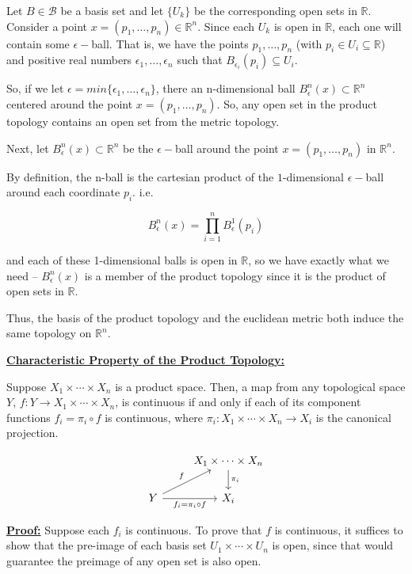 \documentclass{article}
\begin{document}
\vskip 0.5cm
Let $B \in \mathcal B$ be a basis set and let $\{U_k\}$ be the corresponding open sets in $\mathbb{R}$. Consider a point $x = (p_1, \dots, p_n) \in \mathbb{R}^n$. Since each $U_k$ is open in $\mathbb{R}$, each one will contain some $\epsilon-$ball. That is, we have the points $p_1, \dots, p_n$ (with $p_i \in U_i \subseteq \mathbb{R}$) and positive real numbers $\epsilon_1, \dots, \epsilon_n$ such that $B_{\epsilon_i}(p_i) \subseteq U_i$.

\vskip 0.5cm
So, if we let $\epsilon = min\{ \epsilon_1, \dots, \epsilon_n \}$, there an n-dimensional ball $B_{\epsilon}^{n}(x) \subset \mathbb{R}^{n}$ centered around the point $x = (p_1, \dots, p_n)$. So, any open set in the product topology contains an open set from the metric topology.

\vskip 0.5cm
Next, let $B_{\epsilon}^{n}(x) \subset \mathbb{R}^n$ be the $\epsilon-$ball around the point $x = (p_1, \dots, p_n)$ in $\mathbb{R}^n$. 

By definition, the n-ball is the cartesian product of the $1$-dimensional $\epsilon-$ball around each coordinate $p_i$. i.e.

\[ B_{\epsilon}^{n}(x) = \prod_{i = 1}^{n} B_{\epsilon}^1(p_i) \]

and each of these 1-dimensional balls is open in $\mathbb{R}$, so we have exactly what we need -- $B_{\epsilon}^{n}(x)$ is a member of the product topology since it is the product of open sets in $\mathbb{R}$. 

Thus, the basis of the product topology and the euclidean metric both induce the same topology on $\mathbb{R}^n$.

\underline{\textbf{Characteristic Property of the Product Topology:}}

Suppose $X_1 \times \cdots \times X_n$ is a product space. Then, a map from any topological space $Y$, $f : Y \rightarrow X_1 \times \cdots \times X_n$, is continuous if and only if each of its component functions $f_i = \pi_i \circ f$ is continuous, where $\pi_i : X_1 \times \cdots \times X_n \rightarrow X_i$ is the canonical projection.

\[\begin{tikzcd}
	& {X_1 \times \cdots \times X_n} \\
	Y & {X_i}
	\arrow["f", from=2-1, to=1-2]
	\arrow["{f_i = \pi_i \circ f}"', from=2-1, to=2-2]
	\arrow["{\pi_i}", from=1-2, to=2-2]
\end{tikzcd}\]

\vskip 0.5cm
\underline{\textbf{Proof:}} Suppose each $f_i$ is continuous. To prove that $f$ is continuous, it suffices to show that the pre-image of each basis set $U_1 \times \cdots \times U_n$ is open, since that would guarantee the preimage of any open set is also open.
\end{document}
